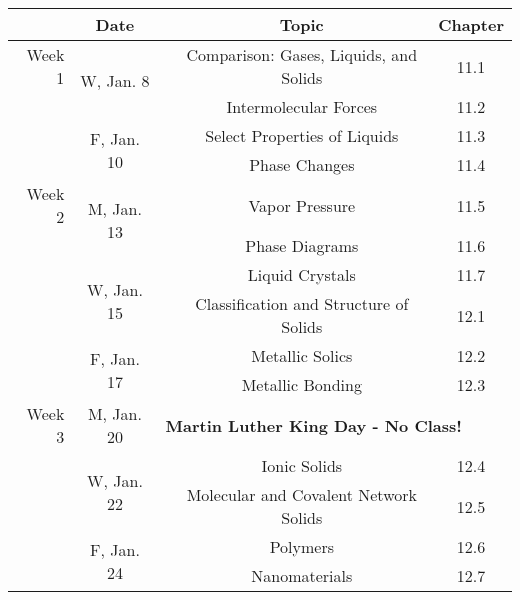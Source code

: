 \documentclass[12pt, letterpaper]{article}
\begin{document}
\begin{tabular}{rcccc}
& Date && Topic & Chapter\\
\midrule
Week 1 & \multirow{2}{*}{W, Jan. 8}& & Comparison: Gases, Liquids, and Solids & 11.1\\
& & & Intermolecular Forces & 11.2\\
& \multirow{2}{*}{F, Jan. 10}& & Select Properties of Liquids & 11.3\\
& & & Phase Changes & 11.4\\
\midrule
Week 2 & \multirow{2}{*}{M, Jan. 13}& & Vapor Pressure & 11.5\\
& & & Phase Diagrams & 11.6\\
& \multirow{2}{*}{W, Jan. 15}& & Liquid Crystals & 11.7\\
& & & Classification and Structure of Solids & 12.1\\
& \multirow{2}{*}{F, Jan. 17}& & Metallic Solics & 12.2\\
& & & Metallic Bonding & 12.3\\
\midrule
Week 3 & M, Jan. 20& \multicolumn{3}{l}{\textbf{Martin Luther King Day - No Class!}}\\
& \multirow{2}{*}{W, Jan. 22}& & Ionic Solids & 12.4\\
& & & Molecular and Covalent Network Solids & 12.5\\
& \multirow{2}{*}{F, Jan. 24}& & Polymers & 12.6\\
& & & Nanomaterials & 12.7\\
\end{tabular}
\end{document}
